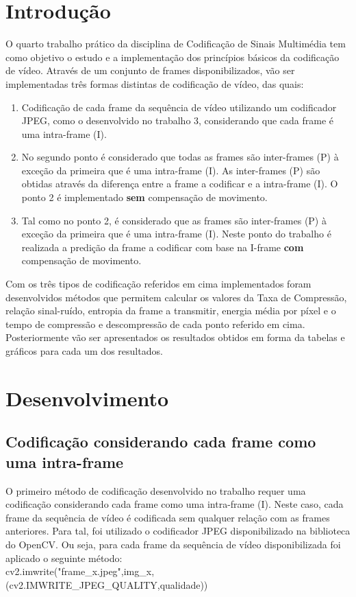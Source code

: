\documentclass[12pt,a4paper]{article}
\begin{document}
\tableofcontents
\newpage
\listoffigures
\newpage
\section{Introdução}
O quarto trabalho prático da disciplina de Codificação de Sinais Multimédia tem como objetivo o estudo e a implementação dos princípios  básicos da codificação de vídeo. Através de um conjunto de frames disponibilizados, vão ser implementadas três formas distintas de codificação de vídeo, das quais:
\begin{enumerate}
  \item Codificação de cada frame da sequência de vídeo utilizando um codificador JPEG, como o desenvolvido no trabalho 3, considerando que cada frame é uma intra-frame (I).
  \item No segundo ponto é considerado que todas as frames são inter-frames (P) à exceção da primeira que é uma intra-frame (I). As inter-frames (P) são obtidas através da diferença entre a frame a codificar e a intra-frame (I). O ponto 2 é implementado \textbf{sem} compensação de movimento. 
  \item Tal como no ponto 2, é considerado que as frames são inter-frames (P) à exceção da primeira que é uma intra-frame (I). Neste ponto do trabalho é realizada a predição da frame a codificar com base na I-frame \textbf{com} compensação de movimento.
  \end{enumerate} 
  
Com os três tipos de codificação referidos em cima implementados foram desenvolvidos métodos que permitem calcular os valores da Taxa de Compressão, relação sinal-ruído, entropia da frame a transmitir, energia média por píxel e o tempo de compressão e descompressão de cada ponto referido em cima. Posteriormente vão ser apresentados os resultados obtidos em forma da tabelas e gráficos para cada um dos resultados.
\newpage
\section{Desenvolvimento}
\subsection{Codificação considerando cada frame como uma intra-frame}
O primeiro método de codificação desenvolvido no trabalho requer uma codificação considerando cada frame como uma intra-frame (I). Neste caso, cada frame da sequência de vídeo é codificada sem qualquer relação com as frames anteriores. Para tal, foi utilizado o codificador JPEG disponibilizado na biblioteca do OpenCV. Ou seja, para cada frame da sequência de vídeo disponibilizada foi aplicado o seguinte método:\\
\newline
cv2.imwrite("frame\_x.jpeg",img\_x,(cv2.IMWRITE\_JPEG\_QUALITY,qualidade))
\newline
\end{document}
